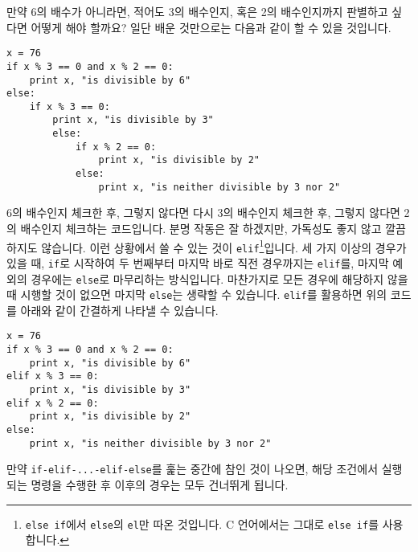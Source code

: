 \documentclass[../main.tex]{subfiles}
\begin{document}
만약 6의 배수가 아니라면, 적어도 3의 배수인지, 혹은 2의 배수인지까지 판별하고 싶다면 어떻게 해야 할까요?
일단 배운 것만으로는 다음과 같이 할 수 있을 것입니다.
\begin{verbatim}
x = 76
if x % 3 == 0 and x % 2 == 0:
	print x, "is divisible by 6"
else:
	if x % 3 == 0:
		print x, "is divisible by 3"
		else:
			if x % 2 == 0:
				print x, "is divisible by 2"
			else:
				print x, "is neither divisible by 3 nor 2"
\end{verbatim}
6의 배수인지 체크한 후, 그렇지 않다면 다시 3의 배수인지 체크한 후, 그렇지 않다면 2의 배수인지 체크하는 코드입니다.
분명 작동은 잘 하겠지만, 가독성도 좋지 않고 깔끔하지도 않습니다.
이런 상황에서 쓸 수 있는 것이 \texttt{elif}\footnote{\texttt{else if}에서 \texttt{else}의 \texttt{el}만 따온 것입니다. C 언어에서는 그대로 \texttt{else if}를 사용합니다.}입니다.
세 가지 이상의 경우가 있을 때, \texttt{if}로 시작하여 두 번째부터 마지막 바로 직전 경우까지는 \texttt{elif}를, 마지막 예외의 경우에는 \texttt{else}로 마무리하는 방식입니다.
마찬가지로 모든 경우에 해당하지 않을 때 시행할 것이 없으면 마지막 \texttt{else}는 생략할 수 있습니다.
\texttt{elif}를 활용하면 위의 코드를 아래와 같이 간결하게 나타낼 수 있습니다.
\begin{verbatim}
x = 76
if x % 3 == 0 and x % 2 == 0:
	print x, "is divisible by 6"
elif x % 3 == 0:
	print x, "is divisible by 3"
elif x % 2 == 0:
	print x, "is divisible by 2"
else:
	print x, "is neither divisible by 3 nor 2"
\end{verbatim}
만약 \texttt{if-elif-...-elif-else}를 훑는 중간에 참인 것이 나오면, 해당 조건에서 실행되는 명령을 수행한 후 이후의 경우는 모두 건너뛰게 됩니다.
\end{document}
